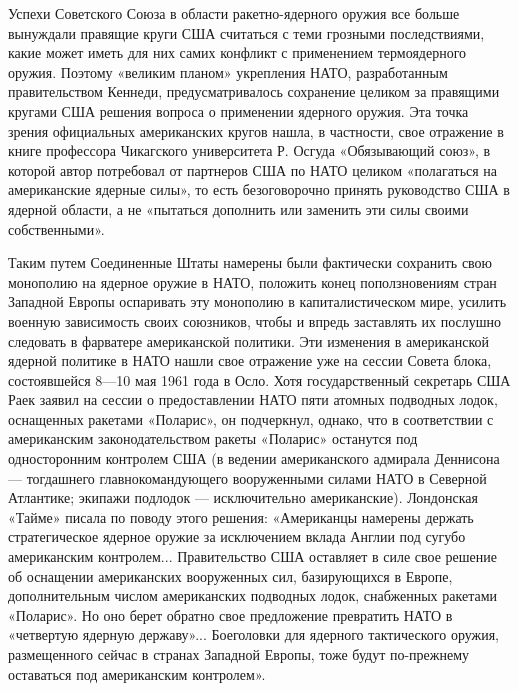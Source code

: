 \documentclass[12pt, a4paper, openany]{book}
\begin{document}
	Успехи Советского Союза в области ракетно-ядерного оружия все больше вынуждали правящие круги США считаться с теми грозными последствиями, какие может иметь для них самих конфликт с применением термоядерного оружия. Поэтому «великим планом» укрепления НАТО, разработанным правительством Кеннеди, предусматривалось сохранение целиком за правящими кругами США решения вопроса о применении ядерного оружия. Эта точка зрения официальных американских кругов нашла, в частности, свое отражение в книге профессора Чикагского университета Р. Осгуда «Обязывающий союз», в которой автор потребовал от партнеров США по НАТО целиком «полагаться на американские ядерные силы», то есть безоговорочно принять руководство США в ядерной области, а не «пытаться дополнить или заменить эти силы своими собственными».
	
	Таким путем Соединенные Штаты намерены были фактически сохранить свою монополию на ядерное оружие в НАТО, положить конец поползновениям стран Западной Европы оспаривать эту монополию в капиталистическом мире, усилить военную зависимость своих союзников, чтобы и впредь заставлять их послушно следовать в фарватере американской политики. Эти изменения в американской ядерной политике в НАТО нашли свое отражение уже на сессии Совета блока, состоявшейся 8—10 мая 1961 года в Осло. Хотя государственный секретарь США Раек заявил на сессии о предоставлении НАТО пяти атомных подводных лодок, оснащенных ракетами «Поларис», он подчеркнул, однако, что в соответствии с американским законодательством ракеты «Поларис» останутся под односторонним контролем США (в ведении американского адмирала Деннисона — тогдашнего главнокомандующего вооруженными силами НАТО в Северной Атлантике; экипажи подлодок — исключительно американские). Лондонская «Тайме» писала по поводу этого решения: «Американцы намерены держать стратегическое ядерное оружие за исключением вклада Англии под сугубо американским контролем... Правительство США оставляет в силе свое решение об оснащении американских вооруженных сил, базирующихся в Европе, дополнительным числом американских подводных лодок, снабженных ракетами «Поларис». Но оно берет обратно свое предложение превратить НАТО в «четвертую ядерную державу»... Боеголовки для ядерного тактического оружия, размещенного сейчас в странах Западной Европы, тоже будут по-прежнему оставаться под американским контролем».
	
\end{document}

